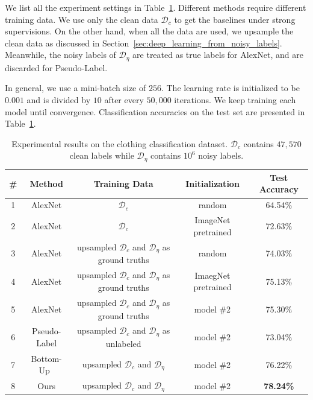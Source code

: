 \documentclass[10pt,twocolumn,letterpaper]{article}
\begin{document}
We list all the experiment settings in Table~\ref{tab:exp}. Different methods require different training data. We use only the clean data $\mathcal{D}_c$ to get the baselines under strong supervisions. On the other hand, when all the data are used, we upsample the clean data as discussed in Section~\ref{sec:deep_learning_from_noisy_labels}. Meanwhile, the noisy labels of $\mathcal{D}_{\eta}$ are treated as true labels for AlexNet, and are discarded for Pseudo-Label.

In general, we use a mini-batch size of $256$. The learning rate is initialized to be $0.001$ and is divided by $10$ after every $50,000$ iterations. We keep training each model until convergence. Classification accuracies on the test set are presented in Table~\ref{tab:exp}.

\begin{table}[t]
\begin{center}
\begin{tabular}{c|c|c|c|c}
\hline
\# & Method & Training Data & Initialization & Test Accuracy\\
\hline\hline
1 & AlexNet & $\mathcal{D}_c$ & random & 64.54\% \\
2 & AlexNet & $\mathcal{D}_c$ & ImageNet pretrained & 72.63\% \\
3 & AlexNet & upsampled $\mathcal{D}_c$ and $\mathcal{D}_{\eta}$ as ground truths & random & 74.03\% \\
4 & AlexNet & upsampled $\mathcal{D}_c$ and $\mathcal{D}_{\eta}$ as ground truths & ImaegNet pretrained & 75.13\% \\
5 & AlexNet & upsampled $\mathcal{D}_c$ and $\mathcal{D}_{\eta}$ as ground truths & model \#2 & 75.30\% \\
6 & Pseudo-Label\cite{lee2013pseudo} & upsampled $\mathcal{D}_c$ and $\mathcal{D}_{\eta}$ as unlabeled & model \#2 & 73.04\% \\
7 & Bottom-Up~\cite{sukhbaatar2014learning} & upsampled $\mathcal{D}_c$ and $\mathcal{D}_{\eta}$ & model \#2 & 76.22\% \\
8 & Ours & upsampled $\mathcal{D}_c$ and $\mathcal{D}_{\eta}$ & model \#2 & \textbf{78.24\%} \\
\hline
\end{tabular}
\end{center}
\caption{Experimental results on the clothing classification dataset. $\mathcal{D}_c$ contains $47,570$ clean labels while $\mathcal{D}_{\eta}$ contains $10^6$ noisy labels.}
\label{tab:exp}
\end{table}
\end{document}
